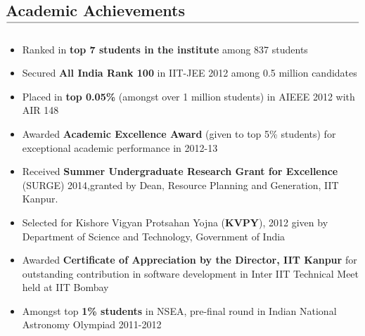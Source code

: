 \documentclass[10pt,letterpaper]{article}
\newcommand\tline[2]{$\underset{\text{#1}}{\text{\underline{\hspace{#2}}}}$}
\begin{document}
\subsection*{Academic Achievements\tline{}{5.2in}}
\vspace{-0.7em}
\begin{itemize}
	\parskip=0.1em

	\item Ranked in \textbf{top 7 students in the institute} among 837 students

	\item Secured \textbf{All India Rank 100} in IIT-JEE 2012 among 0.5 million candidates

	\item Placed in \textbf{top 0.05\%} (amongst over 1 million students) in AIEEE 2012 with AIR 148

	\item Awarded \textbf{Academic Excellence Award} (given to top 5\% students) for exceptional academic performance in
2012-13

	\item Received \textbf{Summer Undergraduate Research Grant for Excellence} (SURGE) 2014,granted by Dean, Resource Planning and Generation, IIT Kanpur.


	\item Selected for Kishore Vigyan Protsahan Yojna (\textbf{KVPY}), 2012 given by Department of Science and Technology,
Government of India

	\item Awarded \textbf{Certificate of Appreciation by the Director, IIT Kanpur} for outstanding contribution in software
development in Inter IIT Technical Meet held at IIT Bombay

	\item Amongst top \textbf{1\% students} in NSEA, pre-final round in Indian National Astronomy Olympiad 2011-2012

	

\end{itemize}




\vspace{-1.8em}
\end{document}
